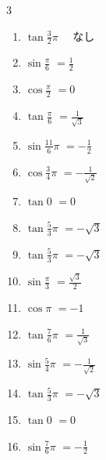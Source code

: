 \begin{multicols}{3}
\begin{enumerate}
  \item $\displaystyle \tan{\frac{3}{2}\pi}$
        $\displaystyle \quad なし$

\columnbreak %

  \item $\displaystyle \sin{\frac{\pi}{6}}$
        $\displaystyle =\frac{1}{2}$

  \item $\displaystyle \cos{\frac{\pi}{2}}$
        $\displaystyle =0$

  \item $\displaystyle \tan{\frac{\pi}{6}}$
        $\displaystyle =\frac{1}{\sqrt{3}}$

  \item $\displaystyle \sin{\frac{11}{6}\pi}$
        $\displaystyle =-\frac{1}{2}$

  \item $\displaystyle \cos{\frac{3}{4}\pi}$
        $\displaystyle =-\frac{1}{\sqrt{2}}$

  \item $\displaystyle \tan{0}$
        $\displaystyle =0$

  \item $\displaystyle \tan{\frac{5}{3}\pi}$
        $\displaystyle =-\sqrt{3}$

  \item $\displaystyle \tan{\frac{5}{3}\pi}$
        $\displaystyle =-\sqrt{3}$

  \item $\displaystyle \sin{\frac{\pi}{3}}$
        $\displaystyle =\frac{\sqrt{3}}{2}$

  \item $\displaystyle \cos{\pi}$
        $\displaystyle =-1$

  \item $\displaystyle \tan{\frac{7}{6}\pi}$
        $\displaystyle =\frac{1}{\sqrt{3}}$

  \item $\displaystyle \sin{\frac{5}{4}\pi}$
        $\displaystyle =-\frac{1}{\sqrt{2}}$

  \item $\displaystyle \tan{\frac{5}{3}\pi}$
        $\displaystyle =-\sqrt{3}$

  \item $\displaystyle \tan{0}$
        $\displaystyle =0$

  \item $\displaystyle \sin{\frac{7}{6}\pi}$
        $\displaystyle =-\frac{1}{2}$


\end{enumerate}
\end{multicols}
